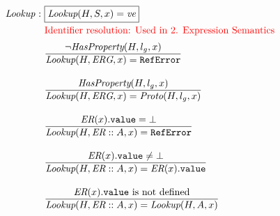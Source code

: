 \documentclass[a4paper, leqno]{amsart}
\def\inred{\color{red}}
\newcommand{\er}{\emph{ER}}
\newcommand{\erg}{\emph{ERG}}
\newcommand{\re}{{\tt RefError}}
\newcommand{\mkst}[2]{#1::#2}
\begin{document}
{\[\begin{array}{l@{}l@{}ll}
\emph{Lookup} & \ : \ & \fbox{$\emph{Lookup}(H,S,x)=\emph{ve}$}\\[.5em]
&&
\mbox{\inred Identifier resolution: Used in 2. Expression Semantics}\\[.5em]
 & \ \ & \frac{
    \begin{matrix}
       \neg \emph{HasProperty}(H,l_g,x)
    \end{matrix}}{
    \begin{matrix}
       \emph{Lookup}(H,\erg,x) = \re
    \end{matrix}} & \\
 & & \\
 & \ \ & \frac{
    \begin{matrix}
       \emph{HasProperty}(H,l_g,x)
    \end{matrix}}{
    \begin{matrix}
       \emph{Lookup}(H,\erg,x) = \emph{Proto}(H,l_g,x)
    \end{matrix}} & \\
 & & \\
 & \ \ & \frac{
    \begin{matrix}
       \er(x).{\tt value} = \bot
    \end{matrix}}{
    \begin{matrix}
      \emph{Lookup}(H,\mkst{\er}A,x)=\re
    \end{matrix}} & \\
 & & \\
 & \ \ & \frac{
    \begin{matrix}
       \er(x).{\tt value} \neq \bot
    \end{matrix}}{
    \begin{matrix}
       \emph{Lookup}(H,\mkst{\er}A,x)=\er(x).{\tt value}
    \end{matrix}} & \\
 & & \\
 & \ \ & \frac{
    \begin{matrix}
       \er(x).{\tt value}\ \mbox{is not defined}
    \end{matrix}}{
    \begin{matrix}
       \emph{Lookup}(H,\mkst{\er}A,x)=\emph{Lookup}(H,A,x)
    \end{matrix}} & \\
 & & \\


\end{array}\]}
\end{document}
